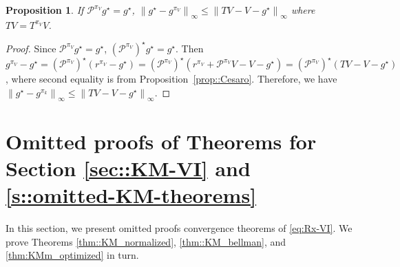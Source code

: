 \documentclass{article} %
\newcommand{\cP}{\mathcal{P}}
\newcommand*{\para}[1]{\left({#1}\right)}
\newcommand*{\infn}[1]{\left\|{#1}\right\|_{\infty}}
\newtheorem{proposition}{Proposition}
\begin{document}
\begin{proposition}\label{prop::Bellman_to_policy}
    If $\cP^{\pi_V}g^{\star} =g^{\star}$, $\infn{g^{\star}-g^{\pi_V}} \le \infn{TV-V-g^{\star}}$ where $TV=T^{\pi_V}V$.
\end{proposition}
\begin{proof}
    Since $\cP^{\pi_V}g^{\star} =g^{\star}$, $\para{\cP^{\pi_V}}^{\star}g^{\star} = g^{\star}$. Then $g^{\pi_V}-g^{\star}=\para{\cP^{\pi_V}}^{\star}(r^{\pi_V}-g^{\star})=\para{\cP^{\pi_V}}^{\star}(r^{\pi_V}+\cP^{\pi_V}V-V-g^{\star})=\para{\cP^{\pi_V}}^{\star}(TV-V-g^{\star})$, where second equality is from Proposition~\ref{prop::Cesaro}.
Therefore, we have $\infn{g^{\star}-g^{\pi_k}}\le \infn{TV-V-g^{\star}}$.
\end{proof}


\vspace{0.1in}


\section{Omitted proofs of Theorems for Section \ref{sec::KM-VI} and \ref{s::omitted-KM-theorems}}\label{s::omitted-Rx-VI-proofs}
In this section, we present omitted proofs convergence theorems of \ref{eq:Rx-VI}. We prove Theorems \ref{thm::KM_normalized}, \ref{thm::KM_bellman}, and \ref{thm:KMm_optimized} in turn.
\end{document}
